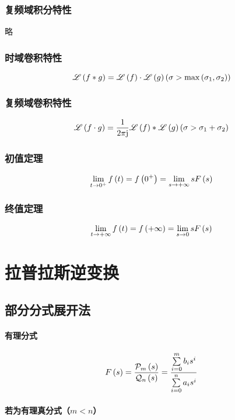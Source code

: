 \documentclass{article}
\begin{document}
\subsubsection{复频域积分特性}

略

\subsubsection{时域卷积特性}

\[\mathscr L\left(f\ast g\right)=\mathscr L\left(f\right)\cdot\mathscr L\left(g\right)
    \left(\sigma>\max\left(\sigma_1,\sigma_2\right)\right)\]

\subsubsection{复频域卷积特性}

\[\mathscr L\left(f\cdot g\right)=
    \frac1{2\pi\mathrm j}\mathscr L\left(f\right)\ast\mathscr L\left(g\right)
    \left(\sigma>\sigma_1+\sigma_2\right)\]

\subsubsection{初值定理}

\[\lim_{t\to0^+}f\left(t\right)=f\left(0^+\right)=\lim_{s\to+\infty}sF\left(s\right)\]

\subsubsection{终值定理}

\[\lim_{t\to+\infty}f\left(t\right)=f\left(+\infty\right)=\lim_{s\to0}sF\left(s\right)\]

\section{拉普拉斯逆变换}

\subsection{部分分式展开法\label{部分分式展开法}}

\paragraph{有理分式}

\[F\left(s\right)=\frac{\mathcal P_m\left(s\right)}{\mathcal Q_n\left(s\right)}
    =\frac{\sum\limits_{i=0}^mb_is^i}{\sum\limits_{i=0}^na_is^i}\]

\paragraph{若为有理真分式（$m<n$）}
\end{document}
